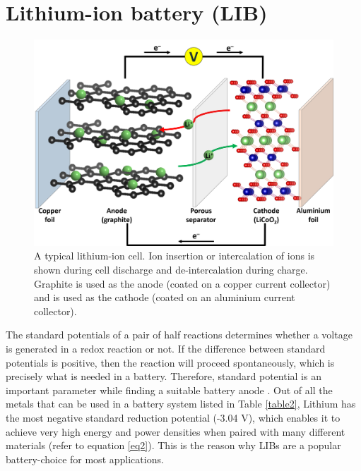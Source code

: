 \section{Lithium-ion battery (LIB)}
\begin{figure}[tbh!]
\centering
\includegraphics[width=\textwidth]{Figures/chap1fig/LIB}
\caption{A typical lithium-ion cell. Ion insertion or intercalation of  ions is shown during cell discharge and de-intercalation during charge. Graphite is used as the anode (coated on a copper current collector) and  is used as the cathode (coated on an aluminium current collector).}
\label{Figures/chap1fig:LIB}
\end{figure}

The standard potentials of a pair of half reactions determines whether a voltage is generated in a redox reaction or not. If the difference between standard potentials is positive, then the reaction will proceed spontaneously, which is precisely what is needed in a battery. Therefore, standard potential is an important parameter while finding a suitable battery anode \cite{liu_understanding_2016}. Out of all the metals that can be used in a battery system listed in Table \ref{table2}, Lithium has the most negative standard reduction potential (-3.04 V), which enables it to achieve very high energy and power densities when paired with many different materials (refer to equation \ref{eq2}). This is the reason why LIBs are a popular battery-choice for most applications.

